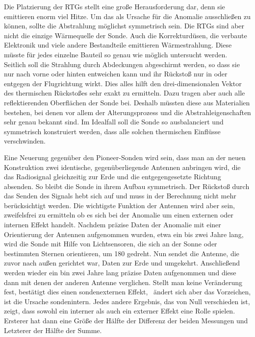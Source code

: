 Die Platzierung der RTGs stellt eine gro{\ss}e Herausforderung dar, denn
sie emittieren enorm viel Hitze. Um das als Ursache f\"ur die Anomalie
ausschlie{\ss}en zu k\"onnen, sollte die Abstrahlung m\"oglichst
symmetrisch sein. Die RTGs sind aber nicht die einzige W\"arme\-quelle
der Sonde. Auch die Korrekturd\"usen, die verbaute Elektronik und viele
andere Bestandteile emittieren W\"armestrahlung. Diese m\"usste f\"ur
jedes einzelne Bauteil so genau wie m\"oglich untersucht werden.
Seitlich soll die Strahlung durch Abdeckungen abge\-schirmt werden, so
dass sie nur nach vorne oder hinten entweichen kann und ihr
R\"ucksto{\ss} nur in oder entgegen der Flugrichtung wirkt. Dies alles
hilft den drei-dimensionalen Vektor des thermischen R\"ucksto{\ss}es
sehr exakt zu ermitteln. Dazu tragen aber auch alle
reflektierenden Oberfl\"achen der Sonde bei. Deshalb m\"ussten diese
aus Materialien beste\-hen, bei denen vor allem der Alterungsprozess
und die Abstrahleigenschaften sehr genau bekannt sind. Im Idealfall
soll die Sonde so ausbalanciert und symmetrisch konstruiert werden,
dass alle solchen thermischen Einfl\"usse verschwinden.


Eine Neuerung gegen\"uber den Pioneer-Sonden wird sein, dass man an der
neuen Kon\-struktion zwei identische, gegen\"uberliegende Antennen
anbringen wird, die das Radiosi\-gnal gleichzeitig zur Erde und die
entgegengesetzte Richtung absenden. So bleibt die Son\-de in ihrem
Aufbau symmetrisch. Der R\"ucksto{\ss} durch das Senden des Signals
hebt sich auf und muss in der Berechnung nicht mehr ber\"ucksichtigt
werden. Die wichtigste Funktion der Antennen wird aber sein,
zweifelsfrei zu ermitteln ob es sich bei der Anomalie um einen externen
oder internen Effekt handelt. Nachdem pr\"azise Daten der Anomalie mit
einer Orientierung der Antennen aufgenommen wurden, etwa ein bis zwei
Jahre lang, wird die Sonde mit Hilfe von Lichtsensoren, die sich an der
Sonne oder bestimmten Sternen orientieren, um 180{\textdegree} gedreht.
Nun sendet die Antenne, die zuvor nach au{\ss}en gerichtet war, Daten
zur Erde und umgekehrt. Anschlie{\ss}end werden wieder ein bin zwei
Jahre lang pr\"azise Daten aufgenommen und diese dann mit denen der
anderen Antenne verglichen. Stellt man keine Ver\"anderung fest,
best\"atigt dies einen sondenexternen Effekt, \ \"andert sich aber das
Vorzeichen, ist die Ursache sondenintern. Jedes andere Ergebnis, das
von Null verschieden ist, zeigt, dass sowohl ein interner als auch ein
externer Effekt eine Rolle spielen. Ersterer hat dann eine Gr\"o{\ss}e
der H\"alfte der Differenz der beiden Messungen und Letzterer der
H\"alfte der Summe.


